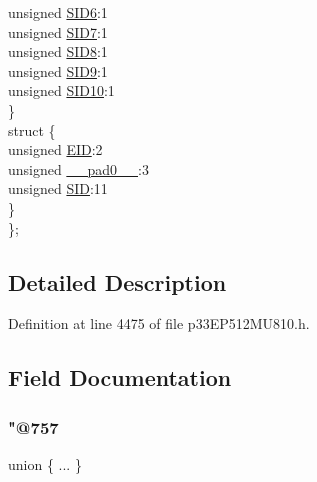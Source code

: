 \begin{DoxyCompactItemize}
\begin{tabbing}
\>\>unsigned \hyperlink{structtag_c1_r_x_f13_s_i_d_b_i_t_s_a70d70952133eb2389d5c326f9f0e8035}{SID6}:1\\
\>\>unsigned \hyperlink{structtag_c1_r_x_f13_s_i_d_b_i_t_s_a34097fb76decd431701fa2d86a22328e}{SID7}:1\\
\>\>unsigned \hyperlink{structtag_c1_r_x_f13_s_i_d_b_i_t_s_afe74894633244fdb0b0c01b4e8c522e7}{SID8}:1\\
\>\>unsigned \hyperlink{structtag_c1_r_x_f13_s_i_d_b_i_t_s_a33587704948067005c2a6a3ccc503c99}{SID9}:1\\
\>\>unsigned \hyperlink{structtag_c1_r_x_f13_s_i_d_b_i_t_s_a1a9084031c7f5fb16007feeebf0d8216}{SID10}:1\\
\>\} \\
\>struct \{\\
\>\>unsigned \hyperlink{structtag_c1_r_x_f13_s_i_d_b_i_t_s_ae80b378c9141f7c03e0b4e55b5f4b54d}{EID}:2\\
\>\>unsigned \hyperlink{structtag_c1_r_x_f13_s_i_d_b_i_t_s_adf71f3d8410c1f1dbbc96680a92c49af}{\_\_pad0\_\_}:3\\
\>\>unsigned \hyperlink{structtag_c1_r_x_f13_s_i_d_b_i_t_s_af88edf93b2fee2432665bd84f51287e4}{SID}:11\\
\>\} \\
\}; \\

\end{tabbing}\end{DoxyCompactItemize}


\subsection{Detailed Description}


Definition at line 4475 of file p33\+E\+P512\+M\+U810.\+h.



\subsection{Field Documentation}
\mbox{\label{structtag_c1_r_x_f13_s_i_d_b_i_t_s_a10ad91623f8bf0370b2736b731a6d47d}} 
\subsubsection{\texorpdfstring{"@757}{@757}}
{\footnotesize\ttfamily union \{ ... \} }

\mbox{\label{structtag_c1_r_x_f13_s_i_d_b_i_t_s_adf71f3d8410c1f1dbbc96680a92c49af}} 
